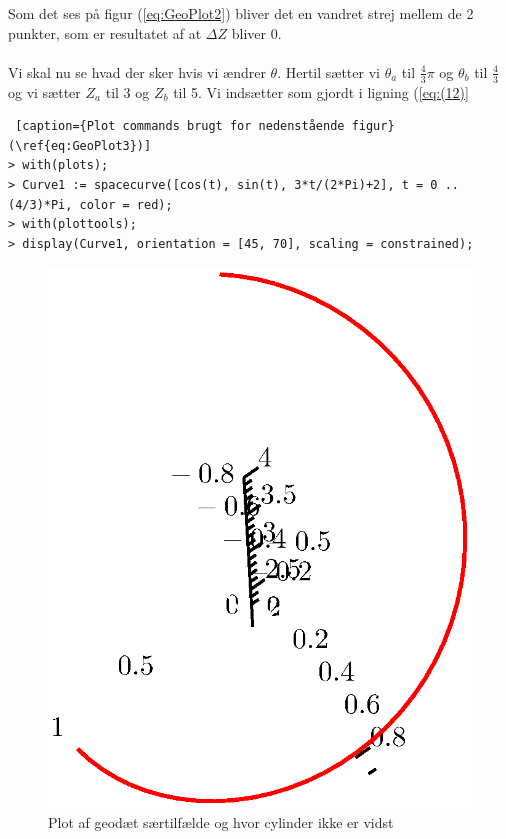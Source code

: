 Som det ses på figur (\ref{eq:GeoPlot2}) bliver det en vandret strej mellem de 2 punkter, som er resultatet af at $\Delta Z$ bliver 0.
\\
\\
Vi skal nu se hvad der sker hvis vi ændrer $\theta$. Hertil sætter vi $\theta_a$ til $\frac{4}{3} \pi$ og $\theta_b$ til $\frac{4}{3}$ og vi sætter $Z_a$ til 3 og $Z_b$ til 5. Vi indsætter som gjordt i ligning (\ref{eq:(12)}
\begin{lstlisting} [caption={Plot commands brugt for nedenstående figur}(\ref{eq:GeoPlot3})]
> with(plots);
> Curve1 := spacecurve([cos(t), sin(t), 3*t/(2*Pi)+2], t = 0 .. (4/3)*Pi, color = red);
> with(plottools);
> display(Curve1, orientation = [45, 70], scaling = constrained);
\end{lstlisting}
\begin{figure}[ht] \label{eq:GeoPlot3}
\center
\includegraphics[scale=0.4]{pictures/Opg8_Fig3.eps}
\caption{Plot af geodæt særtilfælde og hvor cylinder ikke er vidst}
\end{figure}
